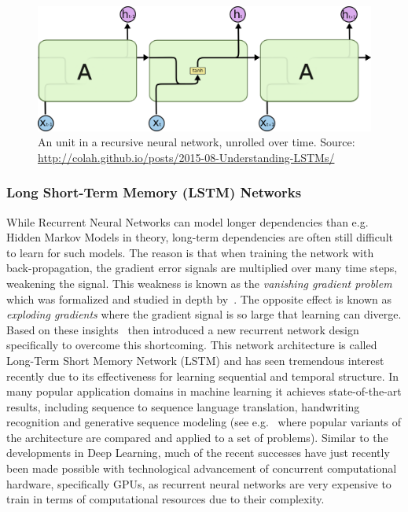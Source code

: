\begin{figure}[h]
  \centering
  \includegraphics[width=\textwidth]{img/LSTM3-SimpleRNN.png}
  \caption{An unit in a recursive neural network, unrolled over time. Source: \url{http://colah.github.io/posts/2015-08-Understanding-LSTMs/}}
\label{fig:RNN}
\end{figure}


\subsubsection*{Long Short-Term Memory (LSTM) Networks}
\label{subs:Long Short-Term Memory (LSTM) Networks}


While Recurrent Neural Networks can model longer dependencies than e.g. Hidden Markov Models in theory, long-term dependencies are often still difficult to learn for such models. The reason is that when training the network with back-propagation, the gradient error signals are multiplied over many time steps, weakening the signal. This weakness is known as the \emph{vanishing gradient problem} which was formalized and studied in depth by~\cite{Hochreiter:1991aa}. The opposite effect is known as \emph{exploding gradients} where the gradient signal is so large that learning can diverge. Based on these insights~\cite{Hochreiter:1997aa} then introduced a new recurrent network design specifically to overcome this shortcoming.
This network architecture is called Long-Term Short Memory Network (LSTM) and has seen tremendous interest recently due to its effectiveness for learning sequential and temporal structure. In many popular application domains in machine learning it achieves state-of-the-art results, including sequence to sequence language translation, handwriting recognition and generative sequence modeling (see e.g.~\cite{Greff:2015aa} where popular variants of the architecture are compared and applied to a set of problems). Similar to the developments in \gls{Deep Learning}, much of the recent successes have just recently been made possible with technological advancement of concurrent computational hardware, specifically \glspl{GPU}, as recurrent neural networks are very expensive to train in terms of computational resources due to their complexity.

